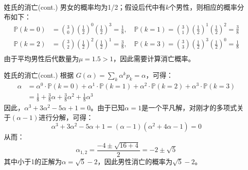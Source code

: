\documentclass[t]{beamer}
\renewcommand{\Pr}{\mathbb{P}}
\begin{document}
\begin{frame}{姓氏的消亡(cont.)}
    男女的概率均为1/2；假设后代中有$k$个男性，则相应的概率分布如下：
    \[\begin{split}
    \Pr(k=0)&={3\choose 0}\left(\frac{1}{2}\right)^0\left(\frac{1}{2}\right)^3=\frac{1}{8},\quad
    \Pr(k=1)={3\choose 1}\left(\frac{1}{2}\right)^1\left(\frac{1}{2}\right)^2=\frac{3}{8}\\
    \Pr(k=2)&={3\choose 2}\left(\frac{1}{2}\right)^2\left(\frac{1}{2}\right)^1=\frac{3}{8},\quad
    \Pr(k=3)={3\choose 3}\left(\frac{1}{2}\right)^3\left(\frac{1}{2}\right)^0=\frac{1}{8}\\
    \end{split} \]
    由于平均男性后代数量为$\mu=1.5>1$，因此需要计算消亡概率。
\end{frame}


\begin{frame}{姓氏的消亡(cont.)}
    根据 $G(\alpha)=\displaystyle\sum_k \alpha^kp_k=\alpha$，可得：
    \[\begin{split}
    \alpha&= \alpha^0\cdot  \Pr(k=0)+\alpha^1\cdot  \Pr(k=1)+\alpha^2 \cdot \Pr(k=2)+\alpha^3\cdot \Pr(k=3) \\
    &=\frac{1}{8}+\frac{3}{8}\alpha+\frac{3}{8}\alpha^2+\frac{1}{8}\alpha^3
    \end{split}\]
    因此，$\alpha^3+3\alpha^2-5\alpha+1=0$。由于已知$\alpha=1$是一个平凡解，对刚才的多项式关于$(\alpha-1)$进行分解，可得：
    \[\alpha^3+3\alpha^2-5\alpha+1=(\alpha-1)(\alpha^2+4\alpha-1)=0 \]
    从而：\[\alpha_{1,2}=\frac{-4\pm\sqrt{16+4}}{2}=-2\pm\sqrt{5} \]
    其中小于1的正解为$\alpha=\sqrt{5}-2$，因此男性消亡的概率为$\sqrt{5}-2$。
\end{frame}
\end{document}
